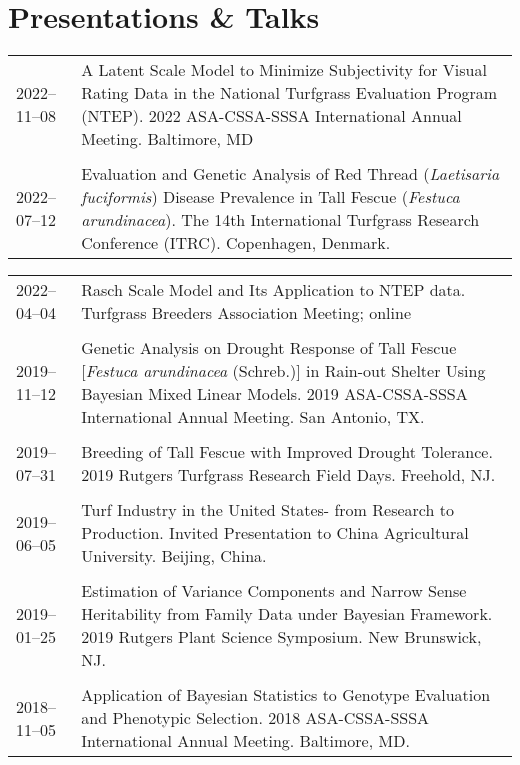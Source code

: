 \documentclass[letterpaper,11pt, english]{article}
\begin{document}
\section{Presentations \& Talks}
\begin{flushleft}
  \begin{tabularx}{\textwidth}{@{}lX@{}}
    2022--11--08 \hspace{1cm} & A Latent Scale Model to Minimize Subjectivity for Visual Rating Data in the National Turfgrass Evaluation Program (NTEP). 2022 ASA-CSSA-SSSA International Annual Meeting. Baltimore, MD \\
    \\[-0.2cm] 
    2022--07--12 \hspace{1cm} & Evaluation and Genetic Analysis of Red Thread (\textit{Laetisaria fuciformis}) Disease Prevalence in Tall Fescue (\textit{Festuca arundinacea}). The 14th International Turfgrass Research Conference (ITRC). Copenhagen, Denmark. \\
  \end{tabularx}
\end{flushleft}
\begin{flushleft}
    \begin{tabularx}{\textwidth}{@{}lX@{}}
    2022--04--04 \hspace{1cm} & Rasch Scale Model and Its Application to NTEP data. Turfgrass Breeders Association Meeting; online \\
    \\[-0.2cm]
    2019--11--12 \hspace{1cm} & Genetic Analysis on Drought Response of Tall Fescue [\textit{Festuca arundinacea} (Schreb.)] in Rain-out Shelter Using Bayesian Mixed Linear Models. 2019 ASA-CSSA-SSSA International Annual Meeting. San Antonio, TX. \\
      \\[-0.2cm]
    2019--07--31 \hspace{1cm} & Breeding of Tall Fescue with Improved Drought Tolerance. 2019 Rutgers Turfgrass Research Field Days. Freehold, NJ. \\
    \\[-0.2cm]
    2019--06--05 \hspace{1cm} & Turf Industry in the United States- from Research to Production. Invited Presentation to China Agricultural University. Beijing, China. \\
    \\[-0.2cm]
    2019--01--25 \hspace{1cm} & Estimation of Variance Components and Narrow Sense Heritability from Family Data under Bayesian Framework. 2019 Rutgers Plant Science Symposium. New Brunswick, NJ. \\
    \\[-0.2cm]
    2018--11--05 \hspace{1cm} & Application of Bayesian Statistics to Genotype Evaluation and Phenotypic Selection. 2018 ASA-CSSA-SSSA International Annual Meeting. Baltimore, MD. \\
  \end{tabularx}
\end{flushleft}
\end{document}
